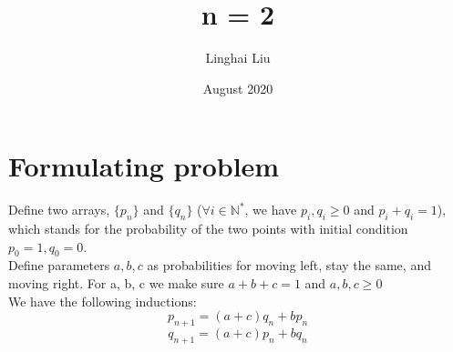 \documentclass{article}
\title{n = 2}
\author{Linghai Liu}
\date{August 2020}
\begin{document}
\maketitle

\section{Formulating problem}
Define two arrays, $\{p_n\}$ and $\{q_n\}$ ($\forall i \in \mathbb{N}^{*}$, we have $p_i,q_i \geq 0$ and $p_i + q_i = 1$), which stands for the probability of the two points with initial condition $p_0=1, q_0=0$. \\
Define parameters $a, b, c$ as probabilities for moving left, stay the same, and moving right. For a, b, c we make sure $a+b+c=1$ and $a,b,c\geq0$\\

We have the following inductions:
\[p_{n+1}=(a+c)q_n+bp_n\] \[q_{n+1}=(a+c)p_n+bq_n\]
\end{document}
